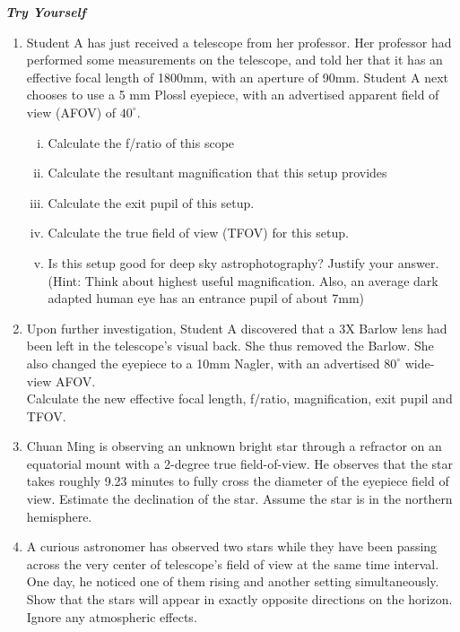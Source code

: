 \documentclass[a4paper,12pt]{extarticle}
\begin{document}
\textbf{\textit{Try Yourself}}
\begin{enumerate}[P1.]	
\item  Student A has just received a telescope from her professor. Her professor had performed some measurements on the telescope, and told her that it has an effective focal length of 1800mm, with an aperture of 90mm. Student A next chooses to use a 5 mm Plossl eyepiece, with an advertised apparent field of view (AFOV) of $40^\circ$.
\begin{enumerate}[i.]
	\item Calculate the f/ratio of this scope
	\item Calculate the resultant magnification that this setup provides
	\item Calculate the exit pupil of this setup.
	\item Calculate the true field of view (TFOV) for this setup.
	\item Is this setup good for deep sky astrophotography? Justify your answer.\\
	(Hint: Think about highest useful magnification. Also, an average dark adapted human eye has an entrance pupil of about 7mm)
\end{enumerate}

\item  Upon further investigation, Student A discovered that a 3X Barlow lens had been left in the telescope’s visual back. She thus removed the Barlow. She also changed the eyepiece to a 10mm Nagler, with an advertised $80^\circ$ wide-view AFOV.\\

Calculate the new effective focal length, f/ratio, magnification, exit pupil and TFOV.

\item Chuan Ming is observing an unknown bright star through a refractor on an equatorial mount with a
2-degree true field-of-view. He observes that the star takes roughly 9.23 minutes to fully cross the
diameter of the eyepiece field of view. Estimate the declination of the star. Assume the star is in the
northern hemisphere.

\item A curious astronomer has observed two stars while they have been passing across the very center of telescope’s field of view at the same time interval. One day, he noticed one of them rising and another setting simultaneously. Show that the stars will appear in exactly opposite directions on the horizon. Ignore any atmospheric effects.
\end{enumerate}
\end{document}
